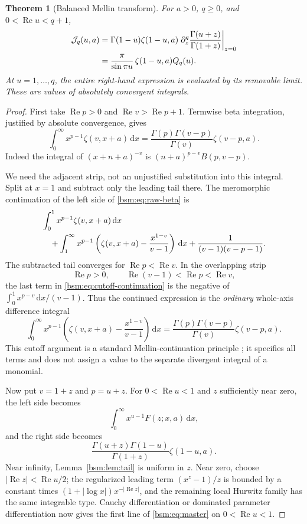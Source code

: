 \documentclass[11pt,letterpaper]{article}
\numberwithin{equation}{section}
\newtheorem{theorem}{Theorem}[section]
\theoremstyle{definition}\newtheorem{definition}[theorem]{Definition}
\theoremstyle{remark}\newtheorem{remark}[theorem]{Remark}
\DeclareMathOperator{\Ree}{Re}
\newcommand{\dd}{\,\mathrm{d}}
\newcommand{\Jcal}{\mathcal J}
\newcommand{\Qcal}{Q}
\begin{document}
\begin{theorem}[Balanced Mellin transform]\label{bsm:thm:master}
For $a>0$, $q\ge0$, and $0<\Ree u<q+1$,
\begin{align}\label{bsm:eq:master}
 \Jcal_q(u,a)
  &=\Gamma(1-u)\zeta(1-u,a)
     \left.\partial_z^q\frac{\Gamma(u+z)}{\Gamma(1+z)}\right|_{z=0}\notag\\
  &=\frac{\pi}{\sin\pi u}\,\zeta(1-u,a)\Qcal_q(u).
\end{align}
At $u=1,\ldots,q$, the entire right-hand expression is evaluated by its
removable limit. These are values of absolutely convergent integrals.
\end{theorem}

\begin{proof}
First take $\Ree p>0$ and $\Ree v>\Ree p+1$. Termwise beta integration,
justified by absolute convergence, gives
\begin{equation}\label{bsm:eq:raw-beta}
 \int_0^\infty x^{p-1}\zeta(v,x+a)\dd x
 =\frac{\Gamma(p)\Gamma(v-p)}{\Gamma(v)}\zeta(v-p,a).
\end{equation}
Indeed the integral of $(x+n+a)^{-v}$ is
$(n+a)^{p-v}B(p,v-p)$.

We need the adjacent strip, not an unjustified substitution into this
integral. Split at $x=1$ and subtract only the leading tail there. The
meromorphic continuation of the left side of \eqref{bsm:eq:raw-beta} is
\begin{align}\label{bsm:eq:cutoff-continuation}
 &\int_0^1x^{p-1}\zeta(v,x+a)\dd x\notag\\
 &\quad+\int_1^\infty x^{p-1}
      \left(\zeta(v,x+a)-\frac{x^{1-v}}{v-1}\right)\dd x
       +\frac1{(v-1)(v-p-1)}.
\end{align}
The subtracted tail converges for $\Ree p<\Ree v$. In the overlapping
strip
\[
 \Ree p>0,\qquad \Ree(v-1)<\Ree p<\Ree v,
\]
the last term in \eqref{bsm:eq:cutoff-continuation} is the negative of
$\int_0^1x^{p-v}\dd x/(v-1)$. Thus the continued expression is the
\emph{ordinary} whole-axis difference integral
\begin{equation}\label{bsm:eq:subtracted-beta}
 \int_0^\infty x^{p-1}
      \left(\zeta(v,x+a)-\frac{x^{1-v}}{v-1}\right)\dd x
 =\frac{\Gamma(p)\Gamma(v-p)}{\Gamma(v)}\zeta(v-p,a).
\end{equation}
This cutoff argument is a standard Mellin-continuation principle
\cite{Zagier}; it specifies all terms and does not assign a value to
the separate divergent integral of a monomial.

Now put $v=1+z$ and $p=u+z$. For $0<\Ree u<1$ and $z$ sufficiently
near zero, the left side becomes
\[
 \int_0^\infty x^{u-1}F(z;x,a)\dd x,
\]
and the right side becomes
\begin{equation}\label{bsm:eq:master-generator}
 \frac{\Gamma(u+z)\Gamma(1-u)}{\Gamma(1+z)}\zeta(1-u,a).
\end{equation}
Near infinity, Lemma~\ref{bsm:lem:tail} is uniform in $z$. Near zero,
choose $|\Ree z|<\Ree u/2$; the regularized leading term
$(x^z-1)/z$ is bounded by a constant times
$(1+|\log x|)x^{-|\Ree z|}$, and the remaining local Hurwitz family
has the same integrable type. Cauchy differentiation or dominated
parameter differentiation now gives the first line of
\eqref{bsm:eq:master} on $0<\Ree u<1$.


\end{proof}
\end{document}

